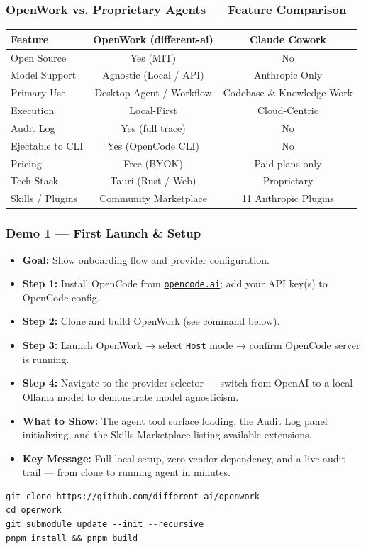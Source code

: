 \begin{frame}[fragile]\frametitle{OpenWork vs. Proprietary Agents — Feature Comparison}
  \begin{center}
  \begin{tabular}{|l|c|c|}
    \hline
    \textbf{Feature} & \textbf{OpenWork (different-ai)} & \textbf{Claude Cowork} \\
    \hline
    Open Source & Yes (MIT) & No \\
    Model Support & Agnostic (Local / API) & Anthropic Only \\
    Primary Use & Desktop Agent / Workflow & Codebase \& Knowledge Work \\
    Execution & Local-First & Cloud-Centric \\
    Audit Log & Yes (full trace) & No \\
    Ejectable to CLI & Yes (OpenCode CLI) & No \\
    Pricing & Free (BYOK) & Paid plans only \\
    Tech Stack & Tauri (Rust / Web) & Proprietary \\
    Skills / Plugins & Community Marketplace & 11 Anthropic Plugins \\
    \hline
  \end{tabular}
  \end{center}
\end{frame}

\begin{frame}[fragile]\frametitle{Demo 1 — First Launch \& Setup}
  \begin{itemize}
    \item \textbf{Goal:} Show onboarding flow and provider configuration.
    \item \textbf{Step 1:} Install OpenCode from \href{https://opencode.ai}{\texttt{opencode.ai}}; add your API key(s) to OpenCode config.
    \item \textbf{Step 2:} Clone and build OpenWork (see command below).
    \item \textbf{Step 3:} Launch OpenWork → select \texttt{Host} mode → confirm OpenCode server is running.
    \item \textbf{Step 4:} Navigate to the provider selector — switch from OpenAI to a local Ollama model to demonstrate model agnosticism.
    \item \textbf{What to Show:} The agent tool surface loading, the Audit Log panel initializing, and the Skills Marketplace listing available extensions.
    \item \textbf{Key Message:} Full local setup, zero vendor dependency, and a live audit trail — from clone to running agent in minutes.
  \end{itemize}
\begin{lstlisting}
git clone https://github.com/different-ai/openwork
cd openwork
git submodule update --init --recursive
pnpm install && pnpm build
\end{lstlisting}
\end{frame}

